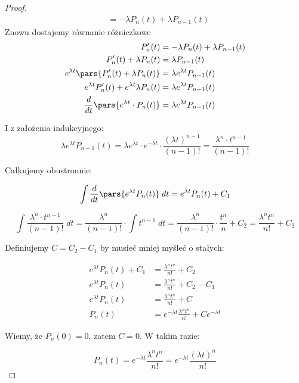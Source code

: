 \begin{proof}
\begin{align*}
		 & = -\lambda P_n(t) + \lambda P_{n-1}(t)
	\end{align*}
	Znowu dostajemy równanie różniczkowe
	\begin{align*}
		P_n'(t)                                                & = -\lambda P_n(t) + \lambda P_{n-1}(t) \\
		P_n'(t) + \lambda P_n(t)                               & = \lambda P_{n-1}(t)                   \\
		e^{\lambda t}\pars{P_n'(t) + \lambda P_n(t)}           & = \lambda e^{\lambda t} P_{n-1}(t)     \\
		e^{\lambda t} P'_{n}(t) + e^{\lambda t} \lambda P_n(t) & = \lambda e^{\lambda t} P_{n-1}(t)     \\
		\frac{d}{dt}\pars{e^{\lambda t}\cdot P_n(t)}           & = \lambda e^{\lambda t} P_{n-1}(t)
	\end{align*}

	I z założenia indukcyjnego:
	\[
		\lambda e^{\lambda t} P_{n-1}(t) = \lambda e^{\lambda t} \cdot e^{-\lambda t} \cdot \frac{(\lambda t)^{n-1}}{(n-1)!} = \frac{\lambda^n \cdot t^{n-1}}{(n-1)!}
	\]

	Całkujemy obustronnie:

	\[
		\int \frac{d}{dt}\pars{e^{\lambda t} P_n(t)} \; dt = e^{\lambda t} P_n(t) + C_1
	\]

	\[
		\int \frac{\lambda^n \cdot t^{n-1}}{(n-1)!} \; dt = \frac{\lambda^n}{(n-1)!} \cdot \int t^{n-1} \; dt  =
		\frac{\lambda^n}{(n-1)!} \cdot \frac{t^n}{n} + C_2 = \frac{\lambda^n t^n}{n!} + C_2
	\]

	Definiujemy \(C = C_2 - C_1\) by musieć mniej myśleć o stałych:

	\begin{align*}
		e^{\lambda t} P_n(t) + C_1 & = \frac{\lambda^n t^n}{n!} + C_2                             \\
		e^{\lambda t} P_n(t)       & = \frac{\lambda^n t^n}{n!} + C_2 - C_1                       \\
		e^{\lambda t} P_n(t)       & = \frac{\lambda^n t^n}{n!} + C                               \\
		P_n(t)                     & = e^{-\lambda t} \frac{\lambda^n t^n}{n!} + C e^{-\lambda t}
	\end{align*}

	Wiemy, że \( P_n(0) = 0 \), zatem \(C = 0\). W takim razie:

	\[
		P_n(t) = e^{-\lambda t} \frac{\lambda^n t^n}{n!} = e^{-\lambda t} \frac{(\lambda t)^n}{n!}
	\]

\end{proof}

